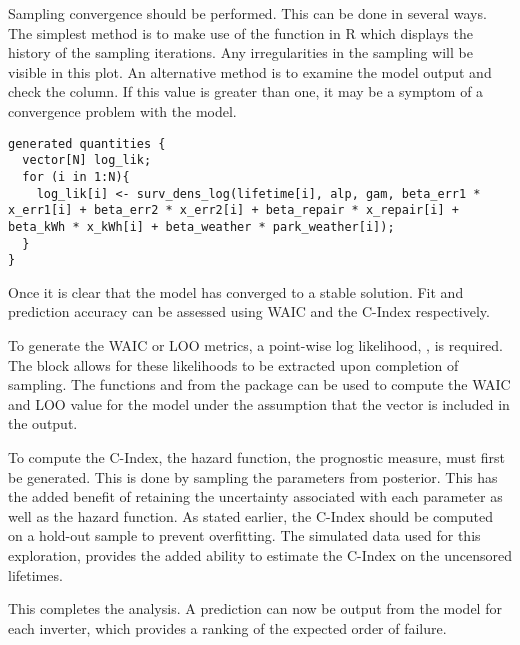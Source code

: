 Sampling convergence should be performed. This can be done in several ways. The simplest method is to make use of the  function in R which displays the history of the sampling iterations. Any irregularities in the sampling will be visible in this plot. An alternative method is to examine the model output and check the  column. If this value is greater than one, it may be a symptom of a convergence problem with the model.

\begin{lstlisting}
generated quantities {
  vector[N] log_lik;
  for (i in 1:N){
  	log_lik[i] <- surv_dens_log(lifetime[i], alp, gam, beta_err1 * x_err1[i] + beta_err2 * x_err2[i] + beta_repair * x_repair[i] + beta_kWh * x_kWh[i] + beta_weather * park_weather[i]);
  }
}
\end{lstlisting}

Once it is clear that the model has converged to a stable solution. Fit and prediction accuracy can be assessed using WAIC and the C-Index respectively. 

To generate the WAIC or LOO metrics, a point-wise log likelihood, , is required. The  block allows for these likelihoods to be extracted upon completion of sampling. The functions  and  from the  package can be used to compute the WAIC and LOO value for the model under the assumption that the  vector is included in the output. 

To compute the C-Index, the hazard function, the prognostic measure, must first be generated. This is done by sampling the parameters from posterior. This has the added benefit of retaining the uncertainty associated with each parameter as well as the hazard function. As stated earlier, the C-Index should be computed on a hold-out sample to prevent overfitting. The simulated data used for this exploration, provides the added ability to estimate the C-Index on the uncensored lifetimes. 

This completes the analysis. A prediction can now be output from the model for each inverter, which provides a ranking of the expected order of failure. 



